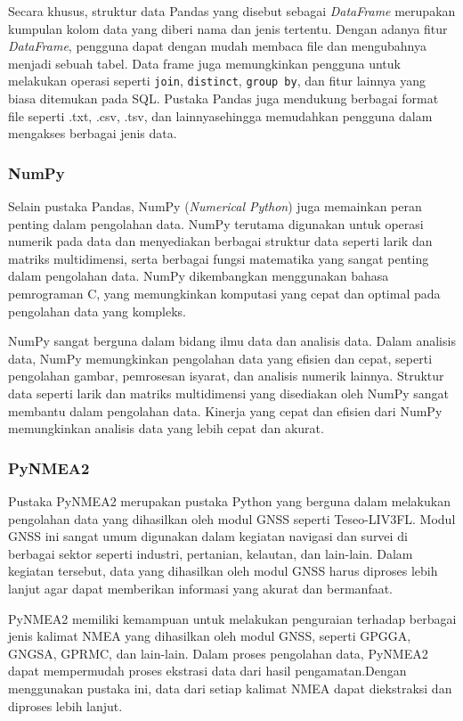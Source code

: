 Secara khusus, struktur data Pandas yang disebut sebagai \textit{DataFrame} merupakan kumpulan kolom data yang diberi nama dan jenis tertentu. Dengan adanya fitur \textit{DataFrame}, pengguna dapat dengan mudah membaca file dan mengubahnya menjadi sebuah tabel. Data frame juga memungkinkan pengguna untuk melakukan operasi seperti \texttt{join}, \texttt{distinct}, \texttt{group by}, dan fitur lainnya yang biasa ditemukan pada SQL. Pustaka Pandas juga mendukung berbagai format file seperti .txt, .csv, .tsv, dan lainnyasehingga memudahkan pengguna dalam mengakses berbagai jenis data.

\subsubsection{NumPy}
Selain pustaka Pandas, NumPy (\textit{Numerical Python}) juga memainkan peran penting dalam pengolahan data. NumPy terutama digunakan untuk operasi numerik pada data dan menyediakan berbagai struktur data seperti larik dan matriks multidimensi, serta berbagai fungsi matematika yang sangat penting dalam pengolahan data. NumPy dikembangkan menggunakan bahasa pemrograman C, yang memungkinkan komputasi yang cepat dan optimal pada pengolahan data yang kompleks.

NumPy sangat berguna dalam bidang ilmu data dan analisis data. Dalam analisis data, NumPy memungkinkan pengolahan data yang efisien dan cepat, seperti pengolahan gambar, pemrosesan isyarat, dan analisis numerik lainnya. Struktur data seperti larik dan matriks multidimensi yang disediakan oleh NumPy sangat membantu dalam pengolahan data. Kinerja yang cepat dan efisien dari NumPy memungkinkan analisis data yang lebih cepat dan akurat.

\subsubsection{PyNMEA2}
Pustaka PyNMEA2 merupakan pustaka Python yang berguna dalam melakukan pengolahan data yang dihasilkan oleh modul GNSS seperti Teseo-LIV3FL. Modul GNSS ini sangat umum digunakan dalam kegiatan navigasi dan survei di berbagai sektor seperti industri, pertanian, kelautan, dan lain-lain. Dalam kegiatan tersebut, data yang dihasilkan oleh modul GNSS harus diproses lebih lanjut agar dapat memberikan informasi yang akurat dan bermanfaat.

PyNMEA2 memiliki kemampuan untuk melakukan penguraian terhadap berbagai jenis kalimat NMEA yang dihasilkan oleh modul GNSS, seperti GPGGA, GNGSA, GPRMC, dan lain-lain. Dalam proses pengolahan data, PyNMEA2 dapat mempermudah proses ekstrasi data dari hasil pengamatan.Dengan menggunakan pustaka ini, data dari setiap kalimat NMEA dapat diekstraksi dan diproses lebih lanjut.

